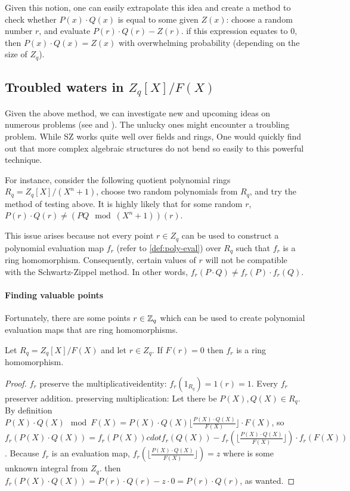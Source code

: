Given this notion, one can easily extrapolate this idea and create a method 
to check whether $P(x)\cdot Q(x)$ is equal to some given $Z(x)$: 
choose a random number $r$, and evaluate $P(r)\cdot Q(r) - Z(r)$.
if this expression equates to $0$, then $P(x)\cdot Q(x)=Z(x)$ with overwhelming 
probability (depending on the size of $Z_q$).

\subsection{Troubled waters in $Z_q[X]/F(X)$}
Given the above method, we can investigate new and upcoming ideas on numerous
problems (see  \cite{sz-usage2} and ).
The unlucky ones might encounter a troubling problem.
While SZ works quite well over fields and rings,
One would quickly find out that more complex algebraic structures do not 
bend so easily to this powerful technique.

For instance, consider the following quotient polynomial rings $R_q=Z_q[X]/(X^n+1)$,
choose two random polynomials from $R_q$, and try the method of testing above.
It is highly likely that for some random $r$, $P(r)\cdot Q(r) \ne (PQ \mod (X^n+1))(r)$.

This issue arises because not every point $r\in Z_q$ can be used to construct a
polynomial evaluation map $f_r$ (refer to \autoref{def:poly-eval}) 
over $R_q$ such that $f_r$ is a ring homomorphism. 
Consequently, certain values of $r$ will not be compatible with the Schwartz-Zippel method.
In other words, $f_r(P\cdot Q) \neq f_r(P)\cdot f_r(Q)$.


\paragraph{Finding valuable points}

Fortunately, there are some points $r\in \mathbb{Z}_q$ which can be used to create polynomial evaluation maps that 
are ring homomorphisms.
\begin{theorem}
  Let $R_q=Z_q[X]/F(X)$ and let $r\in Z_q$. If $F(r)=0$ then $f_r$ is a ring homomorphism.
\end{theorem}
\begin{proof}
  $f_r$ preserve the multiplicativeidentity: $f_r(1_{R_q}) = 1(r)=1$.
  Every $f_r$ preserver addition.
  preserving multiplication:
  Let there be $P(X), Q(X) \in R_q$. 
  By definition $P(X)\cdot Q(X) \mod F(X) = P(X)\cdot Q(X) \lfloor \frac{P(X)\cdot Q(X)}{F(X)} \rfloor \cdot F(X)$,
  so $f_r(P(X)\cdot Q(X))= f_r(P(X))cdot f_r(Q(X)) - f_r(\lfloor  \frac{P(X)\cdot Q(X)}{F(X)} \rfloor)\cdot f_r(F(X))$.
  Because $f_r$ is an evaluation map, $f_r(\lfloor  \frac{P(X)\cdot Q(X)}{F(X)} \rfloor)=z$ where is some unknown integral from $Z_q$.
  then $f_r(P(X)\cdot Q(X)) =P(r)\cdot Q(r) - z \cdot 0= P(r)\cdot Q(r)$, as wanted.
\end{proof}

